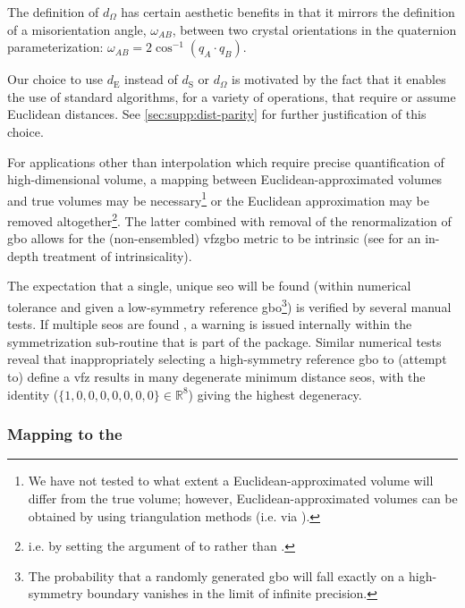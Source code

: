 \documentclass[final,twocolumn,12pt]{elsarticle}
\begin{document}
The definition of $d_\Omega$ has certain aesthetic benefits in that it mirrors the definition of a misorientation angle, $\omega_{AB}$, between two crystal orientations in the quaternion parameterization: $\omega_{AB} = 2 \cos^{-1}{\left(q_A \cdot q_B\right)}$.

Our choice to use $d_{\text{E}}$ instead of $d_{\text{S}}$ or $d_\Omega$ is motivated by the fact that it enables the use of standard algorithms, for a variety of operations, that require or assume Euclidean distances. See \cref{sec:supp:dist-parity} for further justification of this choice. %

For applications other than interpolation which require precise quantification of high-dimensional volume, a mapping between Euclidean-approximated volumes and true volumes may be necessary\footnote{We have not tested to what extent a Euclidean-approximated volume will differ from the true volume; however, Euclidean-approximated volumes can be obtained by using triangulation methods \cite{bairdBarycentricInterpolation7SphereUnderReview} (i.e. via ).} or the Euclidean approximation may be removed altogether\footnote{i.e. by setting the  argument of  to  rather than .}. The latter combined with removal of the renormalization of \gls{gbo} allows for the (non-ensembled) \gls{vfzgbo} metric to be intrinsic (see \citet{morawiecDistancesGrainInterfaces2019} for an in-depth treatment of intrinsicality).

The expectation that a single, unique \gls{seo} will be found (within numerical tolerance and given a low-symmetry reference \gls{gbo}\footnote{The probability that a randomly generated \gls{gbo} will fall exactly on a high-symmetry boundary vanishes in the limit of infinite precision. }) is verified by several manual tests. If multiple \glspl{seo} are found%
, a warning is issued internally within the symmetrization sub-routine  \cite{bairdFiveDegreeofFreedom5DOF2020} that is part of the  package. Similar numerical tests reveal that inappropriately selecting a high-symmetry reference \gls{gbo} to (attempt to) define a \gls{vfz} results in many degenerate minimum distance \glspl{seo}, with the identity ($\{1,0,0,0,0,0,0,0\}\in\mathbb{R}^8$) \cite{francisGeodesicOctonionMetric2019} giving the highest degeneracy.

\subsubsection{Mapping  to the }
\label{sec:methods:framework:proj}
\end{document}
